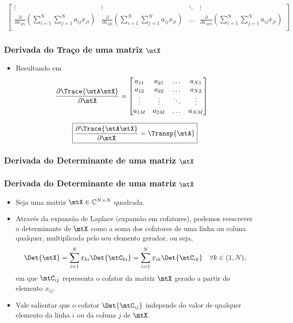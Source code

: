 \begin{frame}
\begin{itemize}
{\begin{align*}
\begin{bmatrix}
				\vdots & \vdots & \ddots & \vdots \\
				\displaystyle \frac{\partial}{\partial x_{M1}} \left( \sum_{i = 1}^{N} \sum_{j = 1}^{N} a_{ij}x_{ji} \right) & 
				\displaystyle \frac{\partial}{\partial x_{M2}} \left( \sum_{i = 1}^{N} \sum_{j = 1}^{N} a_{ij}x_{ji} \right) & 
				\dots & 
				\displaystyle \frac{\partial}{\partial x_{MN}} \left( \sum_{i = 1}^{N} \sum_{j = 1}^{N} a_{ij}x_{ji} \right) \\
			\end{bmatrix} 
		\end{align*}}
	\end{itemize}
\end{frame}


\begin{frame}
	\frametitle{\normalsize Derivada do Traço de uma matriz $\mtX$}
	\begin{itemize}
		\item Resultando em
		{\tiny
		\begin{align*}
			\frac{\partial \Trace{\mtA \mtX}}{\partial \mtX} &= \begin{bmatrix}
				a_{11} & a_{21} & \dots & a_{N1} \\
				a_{12} & a_{22} & \dots & a_{N2} \\
				\vdots & \vdots & \ddots & \vdots \\
				a_{1M} & a_{2M} & \dots & a_{NM} \\
			\end{bmatrix}
		\end{align*}}
		
		\[
			\boxed{\frac{\partial \Trace{\mtA \mtX}}{\partial \mtX} = \Transp{\mtA}}
		\]
	\end{itemize}
\end{frame}

\subsubsection{Derivada do Determinante de uma matriz $\mtX$}
\begin{frame}
	\frametitle{\normalsize Derivada do Determinante de uma matriz $\mtX$}
	\begin{itemize}
		\item Seja uma matriz $\mtX \in \mathbb{C}^{N \times N}$ quadrada.
		\item Através da expansão de Laplace (expansão em cofatores), podemos reescrever o determinante de $\mtX$ como a soma dos cofatores de uma linha ou coluna qualquer, multiplicada pelo seu elemento gerador, ou seja,
		\[
			\Det{\mtX} = \sum_{i = 1}^{N} x_{ki} \Det{\mtC_{ki}} = \sum_{i = 1}^{N} x_{ik} \Det{\mtC_{ik}} \,\,\,\,\,\, \forall k \in (1, N),
		\]
		em que $\mtC_{ij}$ representa o cofator da matriz $\mtX$ gerado a partir do elemento $x_{ij}$.
		\item Vale salientar que o cofator $\Det{\mtC_{ij}}$ independe do valor de qualquer elemento da linha $i$ ou da coluna $j$ de $\mtX$.
	\end{itemize}
\end{frame}

